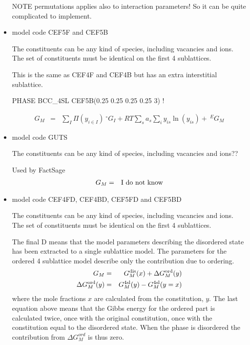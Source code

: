 \documentclass[12pt]{article}
\begin{document}
\begin{itemize}
  NOTE permutations applies also to interaction parameters!  So it can
  be quite complicated to implement.


\item model code CEF5F and CEF5B 

  The constituents can be any kind of species, including vacancies and
  ions.  The set of constituents must be identical on the first 4
  sublattices.

  This is the same as CEF4F and CEF4B but has an extra interstitial
  sublattice.

  PHASE BCC\_4SL CEF5B(0.25 0.25 0.25 0.25 3) ! 

  \begin{eqnarray}
    G_M &=& \sum_I \Pi(y_{i\in I}) ~^{\circ}G_I + RT \sum_s a_s\sum_i y_{is}\ln(y_{is}) + ~^EG_M
  \end{eqnarray}

\item model code GUTS

  The constituents can be any kind of species, including vacancies and
  ions??

  Used by FactSage
  \begin{eqnarray}
    G_M &=& {\rm I~do~not~know}
  \end{eqnarray}

\item model code CEF4FD, CEF4BD, CEF5FD and CEF5BD

  The constituents can be any kind of species, including vacancies and
  ions.  The set of constituents must be identical on the first 4
  sublattices.

  The final D means that the model parameters describing the
  disordered state has been extracted to a single sublattice model.
  The parameters for the ordered 4 sublattice model describe only the
  contribution due to ordering.
  \begin{eqnarray}
    G_M &=& G_M^{\rm dis}(x) + \Delta G_M^{\rm ord}(y)\\
    \Delta G_M^{\rm ord}(y) &=& G_M^{\rm 4sl}(y) - G_M^{\rm 4sl}(y=x)
  \end{eqnarray}
  where the mole fractions $x$ are calculated from the constitution,
  $y$.  The last equation above means that the Gibbs energy for the
  ordered part is calculated twice, once with the original
  constitution, once with the constitution equal to the disordered
  state.  When the phase is disordered the contribution from $\Delta
  G_M^{ord}$ is thus zero.


\end{itemize}
\end{document}
